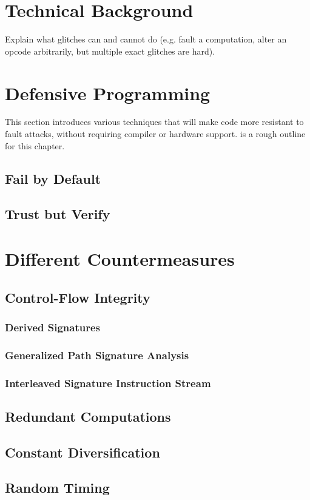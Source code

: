 \chapter{Technical Background}
Explain what glitches can and cannot do (e.g. fault a computation, alter an opcode arbitrarily, but multiple exact glitches are hard).
\chapter{Defensive Programming}
This section introduces various techniques that will make code more resistant to fault attacks, without requiring compiler or hardware support. \cite{witteman2008secure} is a rough outline for this chapter.
\section{Fail by Default}
\section{Trust but Verify}

\chapter{Different Countermeasures}
\section{Control-Flow Integrity}
\subsection{Derived Signatures}
\subsection{Generalized Path Signature Analysis}
\subsection{Interleaved Signature Instruction Stream}
\section{Redundant Computations}
\section{Constant Diversification}
\section{Random Timing}


